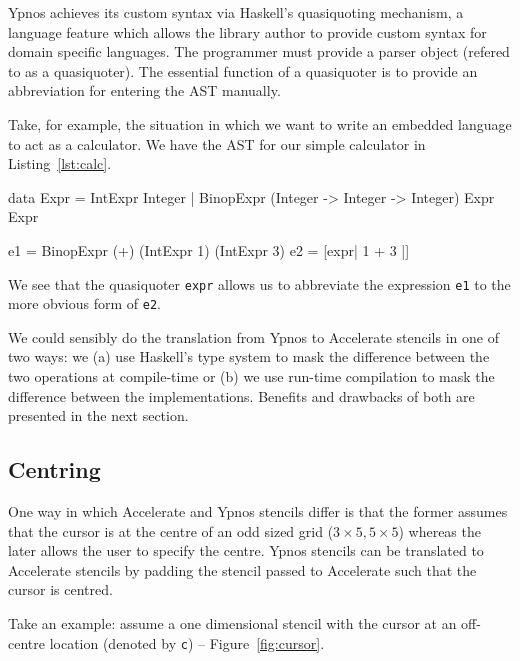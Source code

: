 \documentclass[
    12pt,
    a4paper,
    twoside,
    openright,
    ]{scrbook}
\begin{document}
Ypnos achieves its custom syntax via Haskell's quasiquoting mechanism, a
language feature which allows the library author to provide custom syntax for
domain specific languages\cite{mainland2007}. The programmer must provide a
parser object (refered to as a quasiquoter). The essential function of a
quasiquoter is to provide an abbreviation for entering the AST manually.

Take, for example, the situation in which we want to write an embedded
language to act as a calculator. We have the AST for our
simple calculator in Listing~\ref{lst:calc}.

\begin{hflisting}[label={lst:calc}, caption={A simple calculator defined using an
  AST (\texttt{Expr}) and using a quasiquoter for abbreviated syntax. The definition of
  \texttt{expr} is omitted.}]
data Expr  =  IntExpr Integer
           |  BinopExpr (Integer -> Integer -> Integer) Expr Expr

e1 = BinopExpr (+) (IntExpr 1) (IntExpr 3)
e2 = [expr| 1 + 3 |]
\end{hflisting}

We see that the quasiquoter \texttt{expr} allows us to abbreviate the expression
\texttt{e1} to the more obvious form of \texttt{e2}.

We could sensibly do the translation from Ypnos to Accelerate stencils in one of
two ways: we (a) use Haskell's type system to mask the difference between the
two operations at compile-time or (b) we use run-time compilation to mask the
difference between the implementations. Benefits and drawbacks of both are
presented in the next section.

\subsection{Centring}
\label{sec:centring}

One way in which Accelerate and Ypnos stencils differ is that the former assumes
that the cursor is at the centre of an odd sized grid ($3 \times 5, 5 \times 5$)
whereas the later allows the user to specify the centre. Ypnos stencils can be
translated to Accelerate stencils by padding the stencil passed to Accelerate
such that the cursor is centred.

Take an example: assume a one dimensional stencil with the cursor at an
off-centre location (denoted by \texttt{c}) -- Figure~\ref{fig:cursor}.
\end{document}
